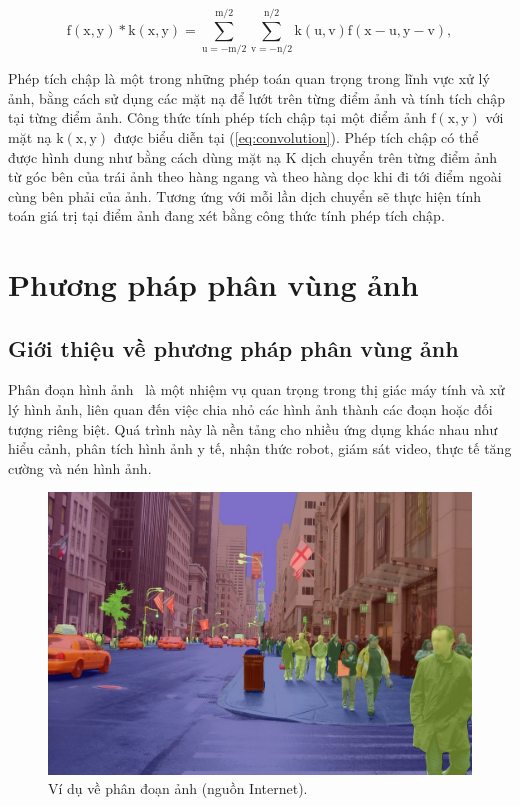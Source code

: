 \begin{equation}
    \mathrm{f(x,y) \ast k(x,y) = \sum_{u=-m/2}^{m/2} \sum_{v=-n/2}^{n/2} k(u,v) f(x-u,y-v)},
    \label{eq:convolution}
\end{equation}

Phép tích chập là một trong những phép toán quan trọng trong lĩnh vực xử lý ảnh, bằng cách sử dụng các mặt nạ để lướt trên từng điểm ảnh và tính tích chập tại từng điểm ảnh. Công thức tính phép tích chập tại một điểm ảnh $\mathrm{f(x,y)}$ với mặt nạ $\mathrm{k(x,y)}$ được biểu diễn tại (\ref{eq:convolution}). Phép tích chập có thể được hình dung như bằng cách dùng mặt nạ $\mathrm{K}$ dịch chuyển trên từng điểm ảnh từ góc bên của trái ảnh theo hàng ngang và theo hàng dọc khi đi tới điểm ngoài cùng bên phải của ảnh. Tương ứng với mỗi lần dịch chuyển sẽ thực hiện tính toán giá trị tại điểm ảnh đang xét bằng công thức tính phép tích chập.

\section{Phương pháp phân vùng ảnh}
\subsection{Giới thiệu về phương pháp phân vùng ảnh}


Phân đoạn hình ảnh~\cite{minaee2021image} là một nhiệm vụ quan trọng trong thị giác máy tính và xử lý hình ảnh, liên quan đến việc chia nhỏ các hình ảnh thành các đoạn hoặc đối tượng riêng biệt. Quá trình này là nền tảng cho nhiều ứng dụng khác nhau như hiểu cảnh, phân tích hình ảnh y tế, nhận thức robot, giám sát video, thực tế tăng cường và nén hình ảnh. 

\begin{figure}[h]
	\centering
	\includegraphics[width=120mm]{fig/image_segmentation.jpg}
        \captionsetup{justification=centering}
	\caption{Ví dụ về phân đoạn ảnh (nguồn Internet).}
	\label{fig_CNNarchitecture}
\end{figure}


